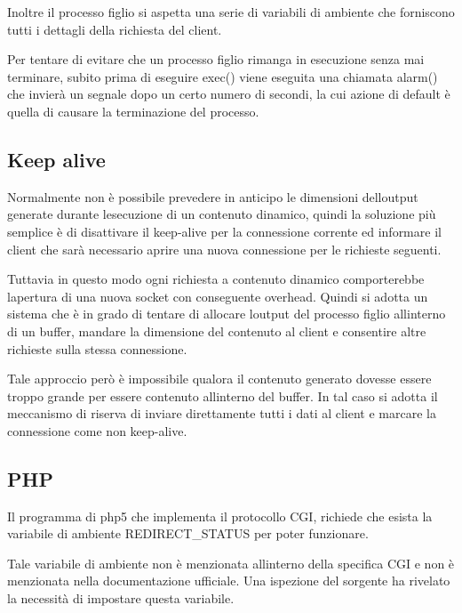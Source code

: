 \documentclass[a4paper,11pt]{article}
\begin{document}
{\sffamily
Inoltre il processo figlio si aspetta una serie di variabili di ambiente
che forniscono tutti i dettagli della richiesta del client.}


\bigskip

{\sffamily
Per tentare di evitare che un processo figlio rimanga in esecuzione
senza mai terminare, subito prima di eseguire exec() viene eseguita una
chiamata alarm() che invier\`a un segnale dopo un certo numero di
secondi, la cui azione di default \`e quella di causare la terminazione
del processo.}


\bigskip

\subsection{Keep alive}
{\sffamily
Normalmente non \`e possibile prevedere in anticipo le dimensioni
dell{\textquotesingle}output generate durante
l{\textquotesingle}esecuzione di un contenuto dinamico, quindi la
soluzione pi\`u semplice \`e di disattivare il keep-alive per la
connessione corrente ed informare il client che sar\`a necessario
aprire una nuova connessione per le richieste seguenti.}

{\sffamily
Tuttavia in questo modo ogni richiesta a contenuto dinamico
comporterebbe l{\textquotesingle}apertura di una nuova socket con
conseguente overhead. Quindi si adotta un sistema che \`e in grado di
tentare di allocare l{\textquotesingle}output del processo figlio
all{\textquotesingle}interno di un buffer, mandare la dimensione del
contenuto al client e consentire altre richieste sulla stessa
connessione.}

{\sffamily
Tale approccio per\`o \`e impossibile qualora il contenuto generato
dovesse essere troppo grande per essere contenuto
all{\textquotesingle}interno del buffer. In tal caso si adotta il
meccanismo di riserva di inviare direttamente tutti i dati al client e
marcare la connessione come non keep-alive.}


\bigskip

\subsection{PHP}
{\sffamily
Il programma di php5 che implementa il protocollo CGI, richiede che
esista la variabile di ambiente
{\textquotedbl}REDIRECT\_STATUS{\textquotedbl} per poter funzionare.}

{\sffamily
Tale variabile di ambiente non \`e menzionata
all{\textquotesingle}interno della specifica CGI e non \`e menzionata
nella documentazione ufficiale. Una ispezione del sorgente ha rivelato
la necessit\`a di impostare questa variabile.}
\end{document}
